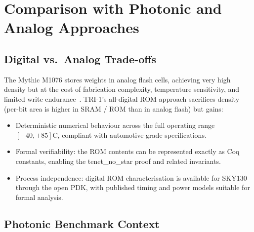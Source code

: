\section{Comparison with Photonic and Analog Approaches}
\label{sec:ch79-comparison}

\subsection{Digital vs.\ Analog Trade-offs}
\label{subsec:ch79-digital-vs-analog}

The Mythic M1076 stores weights in analog flash cells, achieving
very high density but at the cost of fabrication complexity,
temperature sensitivity, and limited write endurance~\cite{mythic_m1076_brief}.
TRI-1's all-digital ROM approach sacrifices density (per-bit area is
higher in SRAM / ROM than in analog flash) but gains:

\begin{itemize}
  \item Deterministic numerical behaviour across the full operating
        range $[-40, +85]$\textdegree{}C, compliant with automotive-grade
        specifications.
  \item Formal verifiability: the ROM contents can be represented
        exactly as Coq constants, enabling the tenet\_no\_star proof
        and related invariants.
  \item Process independence: digital ROM characterisation is available
        for SKY130 through the open PDK, with published timing and
        power models suitable for formal analysis.
\end{itemize}

\subsection{Photonic Benchmark Context}
\label{subsec:ch79-photonic-context}


